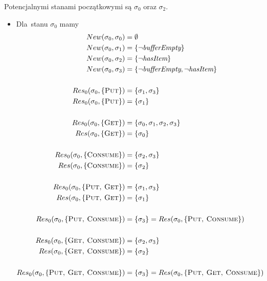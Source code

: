 \documentclass[11pt,a4paper]{article}
\begin{document}
Potencjalnymi stanami początkowymi są $\sigma_0$ oraz $\sigma_2$.

\begin{itemize}
    \item Dla~stanu $\sigma_0$ mamy
    \begin{align*}
        New(\sigma_0, \sigma_0) &= \emptyset \\
        New(\sigma_0, \sigma_1) &= \{\neg \textit{bufferEmpty} \} \\
        New(\sigma_0, \sigma_2) &= \{ \neg \textit{hasItem} \} \\
        New(\sigma_0, \sigma_3) &= \{\neg \textit{bufferEmpty}, \neg \textit{hasItem} \} \\
        \\
        Res_0(\sigma_0, \{ \textsc{Put} \}) &= \{ \sigma_1, \sigma_3 \} \\
        Res_0(\sigma_0, \{ \textsc{Put} \}) &= \{ \sigma_1 \} \\
        \\
        Res_0(\sigma_0, \{ \textsc{Get} \}) &= \{ \sigma_0, \sigma_1, \sigma_2, \sigma_3 \} \\
        Res(\sigma_0, \{ \textsc{Get} \}) &= \{ \sigma_0 \} \\
        \\
        Res_0(\sigma_0, \{ \textsc{Consume} \}) &= \{ \sigma_2, \sigma_3 \} \\
        Res(\sigma_0, \{ \textsc{Consume} \}) &= \{ \sigma_2 \} \\
        \\
        Res_0(\sigma_0, \{ \textsc{Put, Get} \}) &= \{ \sigma_1, \sigma_3 \} \\
        Res(\sigma_0, \{ \textsc{Put, Get} \})  &= \{ \sigma_1 \} \\
        \\
        Res_0(\sigma_0, \{ \textsc{Put, Consume} \}) &= \{ \sigma_3 \} = Res(\sigma_0, \{ \textsc{Put, Consume} \}) \\
        \\
        Res_0(\sigma_0, \{ \textsc{Get, Consume} \}) &= \{ \sigma_2, \sigma_3 \} \\
        Res(\sigma_0, \{ \textsc{Get, Consume} \})  &= \{ \sigma_2 \} \\
        \\
        Res_0(\sigma_0, \{ \textsc{Put, Get, Consume} \}) &= \{ \sigma_3 \} = Res(\sigma_0, \{ \textsc{Put, Get, Consume} \})
    \end{align*}
    

\end{itemize}
\end{document}
